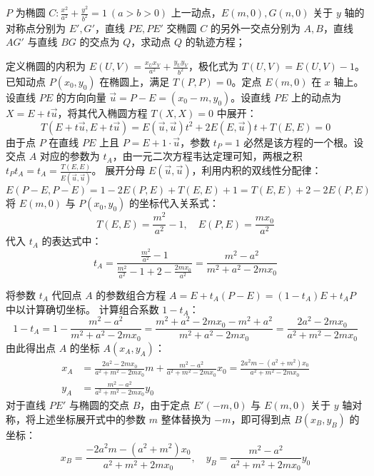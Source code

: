 \begin{exercise}
 \(P\) 为椭圆 \(C: \frac{x^2}{a^2} + \frac{y^2}{b^2} = 1\ (a > b > 0)\) 上一动点，\(E(m,0), G(n,0)\) 关于 \(y\) 轴的对称点分别为 \(E', G'\)，直线 \(PE, PE'\) 交椭圆 \(C\) 的另外一交点分别为 \(A, B\)，直线 \(AG'\) 与直线 \(BG\) 的交点为 \(Q\)，求动点 \(Q\) 的轨迹方程；
\end{exercise}
\begin{solution}
定义椭圆的内积为 $E(U,V) = \frac{x_U x_V}{a^2} + \frac{y_U y_V}{b^2}$，极化式为 $T(U,V) = E(U,V) - 1$。
已知动点 $P(x_0, y_0)$ 在椭圆上，满足 $T(P,P) = 0$。定点 $E(m,0)$ 在 $x$ 轴上。
设直线 $PE$ 的方向向量 $\vec{u} = P - E = (x_0-m, y_0)$。设直线 $PE$ 上的动点为 $X = E + t\vec{u}$，将其代入椭圆方程 $T(X,X) = 0$ 中展开：
$$ T(E+t\vec{u}, E+t\vec{u}) = E(\vec{u},\vec{u})t^2 + 2E(E,\vec{u})t + T(E,E) = 0 $$
由于点 $P$ 在直线 $PE$ 上且 $P = E + 1 \cdot \vec{u}$，参数 $t_P = 1$ 必然是该方程的一个根。设交点 $A$ 对应的参数为 $t_A$，由一元二次方程韦达定理可知，两根之积 $t_P t_A = t_A = \frac{T(E,E)}{E(\vec{u},\vec{u})}$。
展开分母 $E(\vec{u},\vec{u})$，利用内积的双线性分配律：
$$ E(P-E, P-E) = 1 - 2E(P,E) + T(E,E) + 1 = T(E,E) + 2 - 2E(P,E) $$
将 $E(m,0)$ 与 $P(x_0, y_0)$ 的坐标代入关系式：
$$ T(E,E) = \frac{m^2}{a^2} - 1, \quad E(P,E) = \frac{mx_0}{a^2} $$
代入 $t_A$ 的表达式中：
$$ t_A = \frac{\frac{m^2}{a^2}-1}{\frac{m^2}{a^2}-1 + 2 - \frac{2mx_0}{a^2}} = \frac{m^2-a^2}{m^2+a^2-2mx_0} $$

将参数 $t_A$ 代回点 $A$ 的参数组合方程 $A = E + t_A(P-E) = (1-t_A)E + t_A P$ 中以计算确切坐标。
计算组合系数 $1-t_A$：
$$ 1 - t_A = 1 - \frac{m^2-a^2}{m^2+a^2-2mx_0} = \frac{m^2+a^2-2mx_0 - m^2 + a^2}{m^2+a^2-2mx_0} = \frac{2a^2-2mx_0}{a^2+m^2-2mx_0} $$
由此得出点 $A$ 的坐标 $A(x_A, y_A)$：
\begin{align*}
x_A &= \frac{2a^2-2mx_0}{a^2+m^2-2mx_0} m + \frac{m^2-a^2}{a^2+m^2-2mx_0} x_0 =\frac{2a^2 m - (a^2+m^2)x_0}{a^2+m^2-2mx_0} \\
y_A &= \frac{m^2-a^2}{a^2+m^2-2mx_0} y_0
\end{align*}
对于直线 $PE'$ 与椭圆的交点 $B$，由于定点 $E'(-m,0)$ 与 $E(m,0)$ 关于 $y$ 轴对称，将上述坐标展开式中的参数 $m$ 整体替换为 $-m$，即可得到点 $B(x_B, y_B)$ 的坐标：
$$ x_B = \frac{-2a^2 m - (a^2+m^2)x_0}{a^2+m^2+2mx_0}, \quad y_B = \frac{m^2-a^2}{a^2+m^2+2mx_0} y_0 $$


\end{solution}
